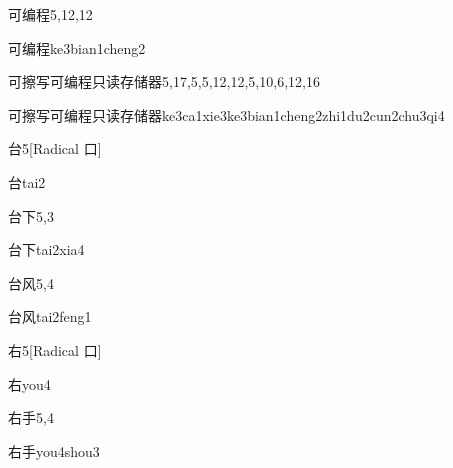 \begin{entry}{可编程}{5,12,12}
  \begin{phonetics}{可编程}{ke3bian1cheng2}
  \end{phonetics}
\end{entry}

\begin{entry*}{可擦写可编程只读存储器}{5,17,5,5,12,12,5,10,6,12,16}
  \begin{phonetics}{可擦写可编程只读存储器}{ke3ca1xie3ke3bian1cheng2zhi1du2cun2chu3qi4}
  \end{phonetics}
\end{entry*}

\begin{entry}{台}{5}[Radical 口]
  \begin{phonetics}{台}{tai2}
  \end{phonetics}
\end{entry}

\begin{entry}{台下}{5,3}
  \begin{phonetics}{台下}{tai2xia4}
  \end{phonetics}
\end{entry}

\begin{entry}{台风}{5,4}
  \begin{phonetics}{台风}{tai2feng1}
  \end{phonetics}
\end{entry}

\begin{entry}{右}{5}[Radical 口]
  \begin{phonetics}{右}{you4}
  \end{phonetics}
\end{entry}

\begin{entry}{右手}{5,4}
  \begin{phonetics}{右手}{you4shou3}
  \end{phonetics}
\end{entry}

